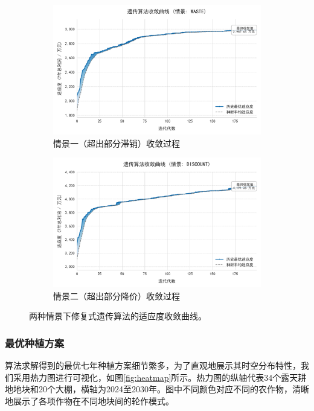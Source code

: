 \begin{figure}[H]
	\centering
	\begin{subfigure}[b]{0.48\textwidth}
		\centering
		\includegraphics[width=\textwidth]{figs/3问题一/情况一ga训练曲线.png}
		\caption{情景一（超出部分滞销）收敛过程}
		\label{fig:conv_case1}
	\end{subfigure}
	\hfill
	\begin{subfigure}[b]{0.48\textwidth}
		\centering
		\includegraphics[width=\textwidth]{figs/3问题一/情况二ga训练曲线.png}
		\caption{情景二（超出部分降价）收敛过程}
		\label{fig:conv_case2}
	\end{subfigure}
	\caption{两种情景下修复式遗传算法的适应度收敛曲线。}
	\label{fig:convergence}
\end{figure}

\vspace{2em}


\subsubsection{最优种植方案}
算法求解得到的最优七年种植方案细节繁多，为了直观地展示其时空分布特性，我们采用热力图进行可视化，如图\ref{fig:heatmap}所示。热力图的纵轴代表34个露天耕地地块和20个大棚，横轴为2024至2030年。图中不同颜色对应不同的农作物，清晰地展示了各项作物在不同地块间的轮作模式。

